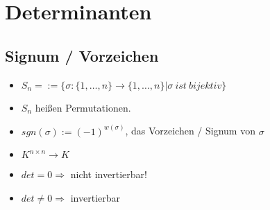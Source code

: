 \documentclass{scrartcl}
\begin{document}
\newpage
\section{Determinanten}
    \subsection{Signum / Vorzeichen}
        \begin{itemize}
            \item $S_n = := \{\sigma   :\{1, \dots, n\} \rightarrow \{1, \dots, n\} | \sigma~ist~bijektiv\}$
            \item $S_n$ heißen Permutationen.
            \item $sgn(\sigma) := (-1)^{w(\sigma)} $, das Vorzeichen / Signum von $\sigma$
        \end{itemize}
        
    \begin{Notiz}
        \begin{itemize}
            \item $K^{n \times n} \rightarrow K$
            \item $det = 0 \Rightarrow$ nicht invertierbar!
            \item $det \neq 0 \Rightarrow$ invertierbar
        \end{itemize}
    \end{Notiz}
\end{document}
